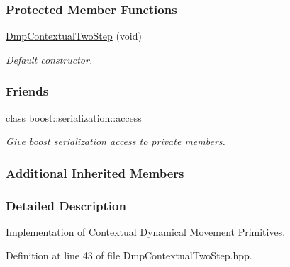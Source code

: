 \subsubsection*{Protected Member Functions}
\begin{DoxyCompactItemize}
\item 
\hyperlink{classDmpBbo_1_1DmpContextualTwoStep_afd51892890cb0f9c67f020e736b6b1e3}{Dmp\+Contextual\+Two\+Step} (void)
\begin{DoxyCompactList}\small\item\em Default constructor. \end{DoxyCompactList}\end{DoxyCompactItemize}
\subsubsection*{Friends}
\begin{DoxyCompactItemize}
\item 
class \hyperlink{classDmpBbo_1_1DmpContextualTwoStep_ac98d07dd8f7b70e16ccb9a01abf56b9c}{boost\+::serialization\+::access}
\begin{DoxyCompactList}\small\item\em Give boost serialization access to private members. \end{DoxyCompactList}\end{DoxyCompactItemize}
\subsubsection*{Additional Inherited Members}


\subsubsection{Detailed Description}
Implementation of Contextual Dynamical Movement Primitives. 

Definition at line 43 of file Dmp\+Contextual\+Two\+Step.\+hpp.




